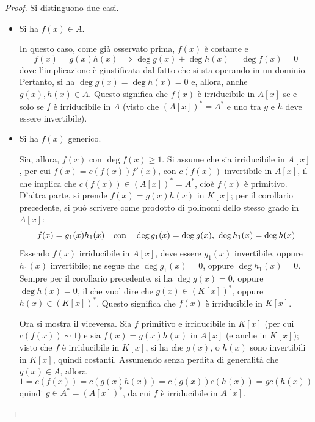 \documentclass[11pt]{article}
\theoremstyle{style}
\numberwithin{equation}{subsection}
\begin{document}
			\begin{proof}
				Si distinguono due casi.	
				\begin{itemize}
					\item Si ha $f(x) \in A$.

						In questo caso, come gi\`a osservato prima, $f(x)$ \`e costante e 
						\[
						f(x) = g(x) h(x) \implies \operatorname{deg} g(x) + \operatorname{deg} h(x) = \operatorname{deg} f(x) = 0 
						\] 
						dove l'implicazione \`e giustificata dal fatto che si sta operando in un dominio.
						Pertanto, si ha $\operatorname{deg} g(x) = \operatorname{deg} h(x) = 0$ e, allora, anche $g(x) ,h(x) \in A$.
						Questo significa che $f(x)$ \`e irriducibile in $A[x]$ se e solo se $f$ \`e irriducibile in $A$ (visto che $(A[x])^* = A^*$ e uno tra $g$ e $h$ deve essere invertibile).
					\item Si ha $f(x)$ generico.

						Sia, allora, $f(x)$ con $\operatorname{deg} f(x) \ge 1$.
						Si assume che sia irriducibile in $A[x]$, per cui $f(x) = c(f(x)) f'(x)$, con $c(f(x))$ invertibile in $A[x]$, il che implica che $c(f(x)) \in (A[x])^* = A^*$, cio\`e $f(x)$ \`e primitivo.
						D'altra parte, si prende $f(x) = g(x) h(x)$ in $K[x]$; per il corollario precedente, si pu\`o scrivere come prodotto di polinomi dello stesso grado in $A[x]$:
						\[
						f(x) = g_1(x) h_1(x) \hspace{.25cm}  \text{ con  } \hspace{.25cm} \operatorname{deg} g_1(x) = \operatorname{deg} g(x) , \ \operatorname{deg} h_1(x) = \operatorname{deg} h(x)
						\] 
						Essendo $f(x)$ irriducibile in $A[x]$, deve essere $g_1(x)$ invertibile, oppure $h_1(x)$ invertibile; ne segue che $\operatorname{deg} g_1(x) = 0$, oppure $\operatorname{deg} h_1(x) = 0$.
						Sempre per il corollario precedente, si ha $\operatorname{deg} g(x) = 0 $, oppure $\operatorname{deg} h(x) = 0$, il che vuol dire che $g(x) \in (K[x])^*$, oppure $h(x) \in (K[x])^*$. 
						Questo significa che $f(x)$ \`e irriducibile in $K[x]$.

						Ora si mostra il viceversa. 
						Sia $f$ primitivo e irriducibile in $K[x]$ (per cui $c(f(x)) \sim 1$) e sia $f(x) = g(x) h(x) $ in $A[x]$ (e anche in $K[x]$); visto che $f$ \`e irriducibile in $K[x]$, si ha che $g(x)$, o $h(x)$ sono invertibili in $K[x]$, quindi costanti.
						Assumendo senza perdita di generalit\`a che $g(x) \in A$, allora
						\[
						1 = c(f(x)) = c(g(x) h(x)) = c(g(x)) c(h(x)) = gc(h(x))
						\] 
						quindi $g \in A^* = (A[x])^*$, da cui $f$ \`e irriducibile in $A[x]$.
				\end{itemize}
			\end{proof}
\end{document}
